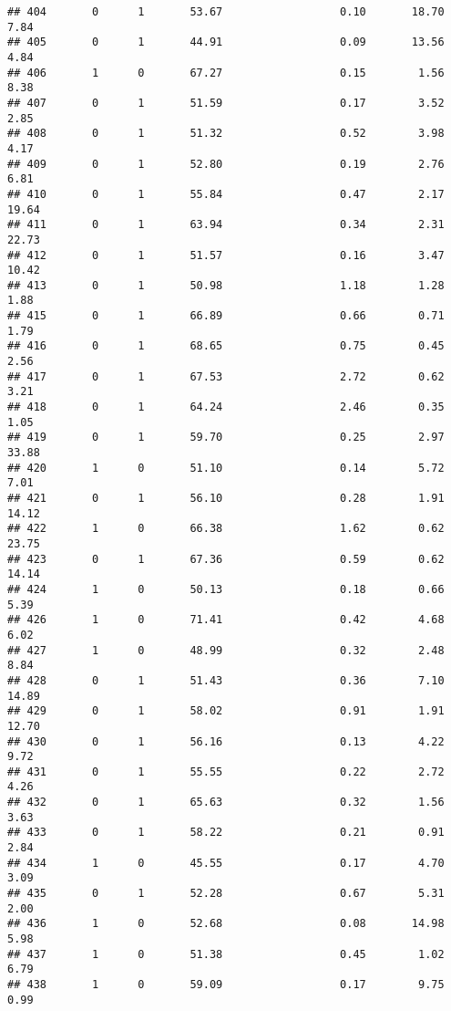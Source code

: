 \documentclass[
]{article}
\begin{document}
\begin{verbatim}
## 404       0      1       53.67                  0.10       18.70        7.84
## 405       0      1       44.91                  0.09       13.56        4.84
## 406       1      0       67.27                  0.15        1.56        8.38
## 407       0      1       51.59                  0.17        3.52        2.85
## 408       0      1       51.32                  0.52        3.98        4.17
## 409       0      1       52.80                  0.19        2.76        6.81
## 410       0      1       55.84                  0.47        2.17       19.64
## 411       0      1       63.94                  0.34        2.31       22.73
## 412       0      1       51.57                  0.16        3.47       10.42
## 413       0      1       50.98                  1.18        1.28        1.88
## 415       0      1       66.89                  0.66        0.71        1.79
## 416       0      1       68.65                  0.75        0.45        2.56
## 417       0      1       67.53                  2.72        0.62        3.21
## 418       0      1       64.24                  2.46        0.35        1.05
## 419       0      1       59.70                  0.25        2.97       33.88
## 420       1      0       51.10                  0.14        5.72        7.01
## 421       0      1       56.10                  0.28        1.91       14.12
## 422       1      0       66.38                  1.62        0.62       23.75
## 423       0      1       67.36                  0.59        0.62       14.14
## 424       1      0       50.13                  0.18        0.66        5.39
## 426       1      0       71.41                  0.42        4.68        6.02
## 427       1      0       48.99                  0.32        2.48        8.84
## 428       0      1       51.43                  0.36        7.10       14.89
## 429       0      1       58.02                  0.91        1.91       12.70
## 430       0      1       56.16                  0.13        4.22        9.72
## 431       0      1       55.55                  0.22        2.72        4.26
## 432       0      1       65.63                  0.32        1.56        3.63
## 433       0      1       58.22                  0.21        0.91        2.84
## 434       1      0       45.55                  0.17        4.70        3.09
## 435       0      1       52.28                  0.67        5.31        2.00
## 436       1      0       52.68                  0.08       14.98        5.98
## 437       1      0       51.38                  0.45        1.02        6.79
## 438       1      0       59.09                  0.17        9.75        0.99

\end{verbatim}
\end{document}
